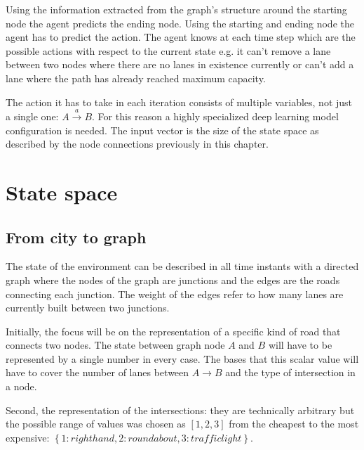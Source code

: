 \documentclass[
]{elteikthesis}[2023/04/10]
\begin{document}
Using the information extracted from the graph's structure around
the starting node the agent predicts the ending node. Using the starting
and ending node the agent has to predict the action. The agent knows
at each time step which are the possible actions with respect to the
current state e.g. it can't remove a lane between two nodes where
there are no lanes in existence currently or can't add a lane where
the path has already reached maximum capacity. 

The action it has to take in each iteration consists of multiple variables,
not just a single one: $A\stackrel{a}{\rightarrow}B$. For this reason
a highly specialized deep learning model configuration is needed.
The input vector is the size of the state space as described by the
node connections previously in this chapter.

\section{State space}

\subsection{From city to graph}

The state of the environment can be described in all time instants
with a directed graph where the nodes of the graph are junctions and
the edges are the roads connecting each junction. The weight of the
edges refer to how many lanes are currently built between two junctions.

Initially, the focus will be on the representation of a specific kind
of road that connects two nodes. The state between graph node $A$
and $B$ will have to be represented by a single number in every case.
The bases that this scalar value will have to cover the number of
lanes between $A\rightarrow B$ and the type of intersection in a
node. 

Second, the representation of the intersections: they are technically
arbitrary but the possible range of values was chosen as $\left[1,2,3\right]$
from the cheapest to the most expensive: $\left\{ 1:righthand,2:roundabout,3:trafficlight\right\} $.
\end{document}

